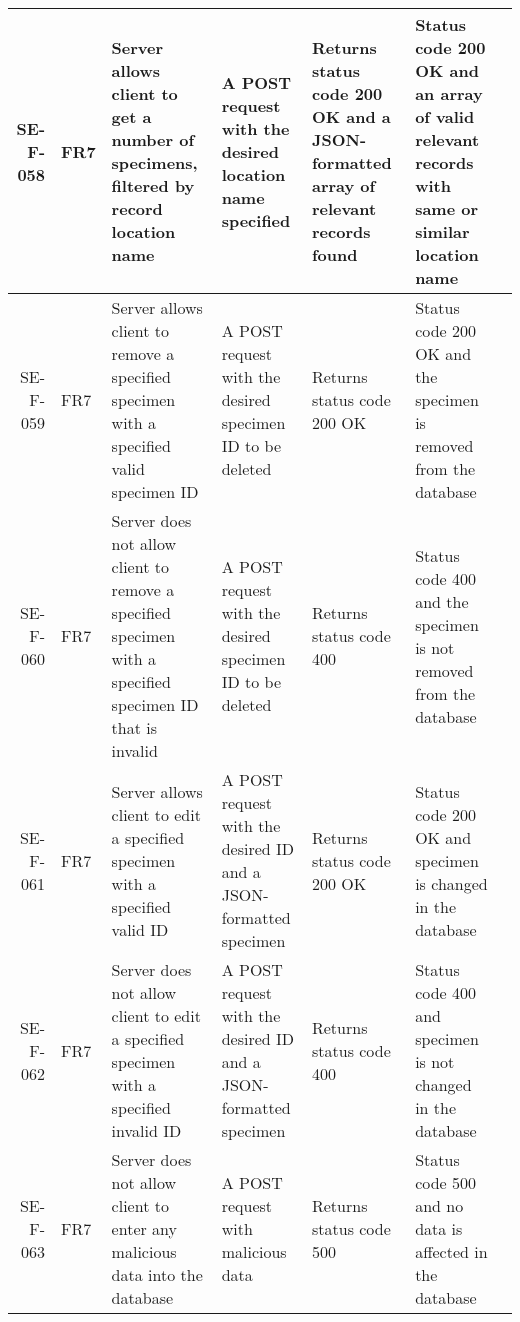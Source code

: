 \begin{landscape}
\begin{longtable}{|r|l|p{4cm}|p{4cm}|p{4cm}|p{4cm}|l|}
		SE-F-058 & FR7 & Server allows client to get a number of specimens, filtered by record location name & A POST request with the desired location name specified & Returns status code 200 OK and a JSON-formatted array of relevant records found & Status code 200 OK and an array of valid relevant records with same or similar location name & \\ \hline
		SE-F-059 & FR7 & Server allows client to remove a specified specimen with a specified valid specimen ID &  A POST request with the desired specimen ID to be deleted &  Returns status code 200 OK &  Status code 200 OK and the specimen is removed from the database & \\ \hline
		SE-F-060 & FR7 & Server does not allow client to remove a specified specimen with a specified specimen ID that is invalid&  A POST request with the desired specimen ID to be deleted &  Returns status code 400 &  Status code 400 and the specimen is not removed from the database & \\ \hline
		SE-F-061 & FR7 & Server allows client to edit a specified specimen with a specified valid ID & A POST request with the desired ID and a JSON-formatted specimen & Returns status code 200 OK  & Status code 200 OK and specimen is changed in the database & \\ \hline
		SE-F-062 & FR7 & Server does not allow client to edit a specified specimen with a specified invalid ID & A POST request with the desired ID and a JSON-formatted specimen & Returns status code 400  & Status code 400 and specimen is not changed in the database & \\ \hline
		SE-F-063 & FR7 & Server does not allow client to enter any malicious data into the database & A POST request with malicious data & Returns status code 500 & Status code 500 and no data is affected in the database & \\ \hline
		\end{longtable}
	\end{landscape}
